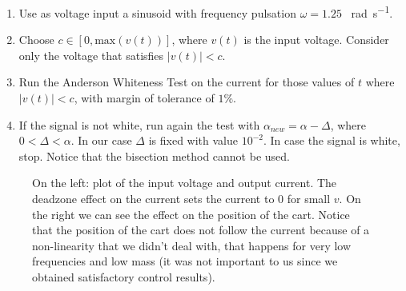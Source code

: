 \begin{enumerate}
\item Use as voltage input a sinusoid with frequency pulsation $\omega = 1.25$ \SI{}{\radian \per \second}. 
\item Choose $c \in [0, \text{max}(v(t))]$, where $v(t)$ is the input voltage. Consider only the voltage that satisfies $|v(t)| < c$.
\item Run the Anderson Whiteness Test on the current for those values of $t$ where $|v(t)|<c$, with margin of tolerance of $1$\%.
\item {If the signal is not white, run again the test with $\alpha_{new}=\alpha-\Delta$,  where $0<\Delta < \alpha$. In our case $\Delta$ is fixed with value $10^{-2}$. In case the signal is white, stop. Notice that the bisection method cannot be used.}
\end{enumerate}
  \begin{figure}[!tbh]
  \centering
  \hfill
  \caption{On the left: plot of the input voltage and output current. The deadzone effect on the current sets the current to 0 for small $v$. On the right  we can see the effect on the position of the cart. Notice that the position of the cart does not follow the current because of a non-linearity that we didn't deal with, that happens for very low frequencies and low mass (it was not important to us since we obtained satisfactory control results).}
    \label{fig:curposvolt}
\end{figure}
